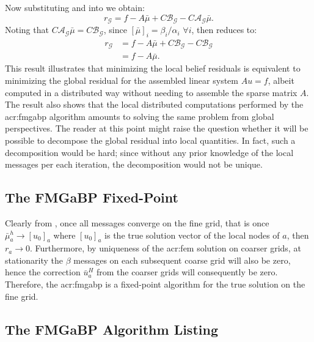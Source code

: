 Now substituting  and  into  we obtain:
\begin{equation}
	r_{\mathcal{G}} = f - A\bar{\mu} +  C \mathcal{B}_{\mathcal{G}} - C \mathcal{A}_{\mathcal{G}} \bar{\mu}. \label{eqn:glbResMess_2}
\end{equation}
Noting that $C \mathcal{A}_{\mathcal{G}} \bar{\mu} = C \mathcal{B}_{\mathcal{G}}$, since $[\bar{\mu}]_i = \beta_i / \alpha_i\,\,\forall i$, then  reduces to:
\begin{align}
	r_{\mathcal{G}} & = f - A\bar{\mu} +  C \mathcal{B}_{\mathcal{G}} - C \mathcal{B}_{\mathcal{G}}\\
	& = f - A\bar{\mu}.
\end{align}
This result illustrates that minimizing the local belief residuals is equivalent to minimizing the global residual for the assembled linear system $Au=f$, albeit computed in a distributed way without needing to assemble the sparse matrix $A$.
The result also shows that the local distributed computations performed by the \gls{acr:fmgabp} algorithm amounts to solving the same problem from global perspectives.
The reader at this point might raise the question whether it will be possible to decompose the global residual into local quantities.
In fact, such a decomposition would be hard; since without any prior knowledge of the local messages per each iteration, the decomposition would not be unique.


\subsection{The FMGaBP Fixed-Point}
Clearly from , once all messages converge on the fine grid, that is once $\bar{\mu}_a^h \to \left[ u_0 \right]_a$ where $\left[ u_0 \right]_a$ is the true solution vector of the local nodes of $a$, then $r_a \to 0$.
Furthermore, by uniqueness of the \gls{acr:fem} solution on coarser grids, at stationarity the $\beta$ messages on each subsequent coarse grid will also be zero, hence the correction $\bar{u}_a^H$ from the coarser grids will consequently be zero.
Therefore, the \gls{acr:fmgabp} is a fixed-point algorithm for the true solution on the fine grid.

\subsection{The FMGaBP Algorithm Listing}

